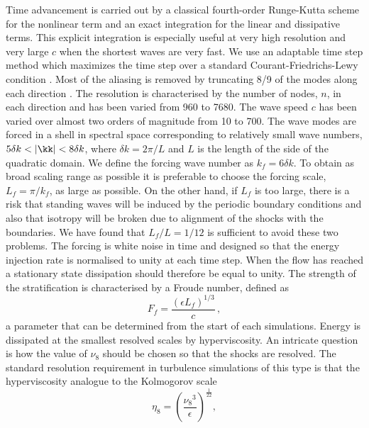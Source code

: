 %
Time advancement is carried out by a classical fourth-order Runge-Kutta scheme
for the nonlinear term and an exact integration for the linear and dissipative
terms. This explicit integration is especially useful at very high resolution
and very large $c$ when the shortest waves are very fast. We use an adaptable
time step method which maximizes the time step over a standard
Courant-Friedrichs-Lewy condition \cite[]{Lundbladh1999, AugierChomazBillant2012}.
%
Most of the aliasing is removed by truncating 8/9 of the modes along each
direction \cite[for a detail discussion on the issues of the non-conservation
of the non-quadratic energy and the aliasing errors in the truncated one-layer
shallow water model, see][]{FargeSadourny1989}. The resolution is characterised
by the number of nodes, $n$, in each direction and has been varied from 960
to 7680.
%
The wave speed $c$ has been varied over almost two orders of magnitude from 10
to 700. The wave modes are forced in a shell in spectral space corresponding to
relatively small wave numbers, $ 5 \delta k < |\kk| < 8 \delta k$, where $
\delta k = 2 \pi /L $ and $ L $ is the length of the side of the quadratic
domain.  We define the forcing wave number as $ k_f = 6 \delta k $. To obtain as broad scaling range as possible it is preferable to choose 
the forcing scale, $ L_f = \pi/k_f $, as large as possible. On the other hand, if $ L_f $ is too large, there is a risk that standing waves will be induced by the periodic boundary conditions and also that isotropy will be broken due to alignment of the shocks with the boundaries. 
We have found that $ L_f/L =1/12 $ is sufficient to avoid these two problems. 
The forcing is white noise in time and designed so that the energy
injection rate is normalised to unity at each time step. When the flow has reached a stationary state dissipation should therefore be equal to unity. 
The strength of the stratification is characterised by a
Froude number, defined as
\begin{equation} \label{Fr}
F_f = \frac{(\epsilon L_f)^{1/3}}{c} \, ,
\end{equation}
a parameter that can be determined from the start of each simulations.
Energy is dissipated at the smallest resolved scales by hyperviscosity. An intricate question is how the value of $ \nu_{8} $ should be chosen so that the shocks are resolved. The standard resolution requirement in turbulence simulations of this type is that the hyperviscosity analogue to the Kolmogorov scale
\begin{equation}  \label{KolmEight}
\eta_{8} = \left( \frac{{\nu_8}^3}{\epsilon} \right)^{\frac{1}{22}},
\end{equation}
